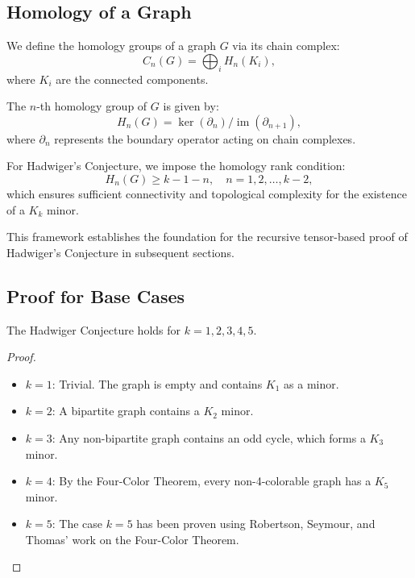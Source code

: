\documentclass{article}
\theoremstyle{plain}
\begin{document}
\subsection{Homology of a Graph}
We define the homology groups of a graph $G$ via its chain complex:
\begin{equation}
    C_n(G) = \bigoplus_{i} H_n(K_i),
\end{equation}
where $K_i$ are the connected components.

The $n$-th homology group of $G$ is given by:
\begin{equation}
    H_n(G) = \ker(\partial_n)/\operatorname{im}(\partial_{n+1}),
\end{equation}
where $\partial_n$ represents the boundary operator acting on chain complexes.

For Hadwiger’s Conjecture, we impose the homology rank condition:
\begin{equation}
    H_n(G) \geq k - 1 - n, \quad n = 1,2,\dots,k-2,
\end{equation}
which ensures sufficient connectivity and topological complexity for the existence of a $K_k$ minor.

This framework establishes the foundation for the recursive tensor-based proof of Hadwiger’s Conjecture in subsequent sections.

\subsection{Proof for Base Cases}

\begin{lemma}
The Hadwiger Conjecture holds for $k = 1, 2, 3, 4, 5$.
\end{lemma}

\begin{proof}
\begin{itemize}
    \item $k = 1$: Trivial. The graph is empty and contains $K_1$ as a minor.
    \item $k = 2$: A bipartite graph contains a $K_2$ minor.
    \item $k = 3$: Any non-bipartite graph contains an odd cycle, which forms a $K_3$ minor.
    \item $k = 4$: By the Four-Color Theorem, every non-4-colorable graph has a $K_5$ minor.
    \item $k = 5$: The case $k = 5$ has been proven using Robertson, Seymour, and Thomas' work on the Four-Color Theorem.
\end{itemize}
\end{proof}
\end{document}
